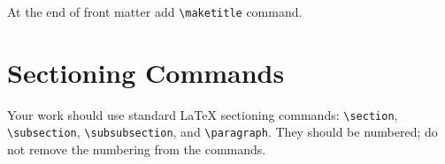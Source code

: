 \documentclass[
]{ceurart}
\begin{document}






At the end of front matter add \verb|\maketitle| command.

\section{Sectioning Commands}

Your work should use standard \LaTeX{} sectioning commands:
\verb|\section|, \verb|\subsection|,
\verb|\subsubsection|, and
\verb|\paragraph|. They should be numbered; do not remove
the numbering from the commands.
\end{document}
